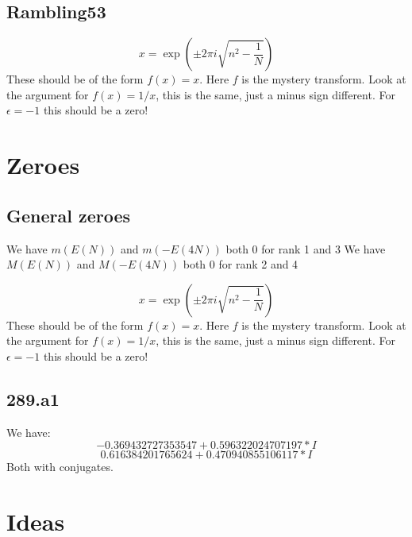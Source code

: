 \documentclass[a4paper]{amsart}
\begin{document}
\subsection{Rambling53}
$$x = \exp(\pm 2\pi i\sqrt{n^2 - \frac{1}{N}})$$
These should be of the form $f(x) = x$. Here $f$ is the mystery transform. Look at the argument for $f(x) = 1/x$, this is the same, just a minus sign different. For $\epsilon = -1$ this should be a zero!

\section{Zeroes}

\subsection{General zeroes}

We have $m(E(N))$ and $m(-E(4N))$ both $0$ for rank 1 and 3
We have $M(E(N))$ and $M(-E(4N))$ both $0$ for rank 2 and 4


$$x = \exp(\pm 2\pi i\sqrt{n^2 - \frac{1}{N}})$$
These should be of the form $f(x) = x$. Here $f$ is the mystery transform. Look at the argument for $f(x) = 1/x$, this is the same, just a minus sign different. For $\epsilon = -1$ this should be a zero!

\subsection{289.a1}

We have:
$$-0.369432727353547 + 0.596322024707197*I$$
$$0.616384201765624 + 0.470940855106117*I$$
Both with conjugates.

\section{Ideas}
\end{document}
